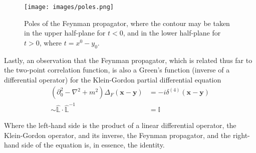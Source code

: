 \begin{figure}[H]
	\centering
	\texttt{[image: images/poles.png]}
	\caption{Poles of the Feynman propagator, where the contour may be taken in the upper half-plane for $t<0$, and in the lower half-plane for $t>0$, where $t=x^0-y_0$.}
\end{figure}

\noindent Lastly, an observation that the Feynman propagator, which is related thus far to the two-point correlation function, is also a Green's function (inverse of a differential operator) for the Klein-Gordon partial differential equation
\begin{align}
(\partial_0^2 - \nabla^2 + m^2) \Delta_F(\textbf{x} - \textbf{y}) &= -i \delta^{(4)} (\textbf{x} - \textbf{y}) \\
\sim \hat{\mathbb{L}} \cdot \hat{\mathbb{L}}^{-1} &= \mathbb{I}
\end{align}

\noindent Where the left-hand side is the product of a linear differential operator, the Klein-Gordon operator, and its inverse, the Feynman propagator, and the right-hand side of the equation is, in essence, the identity.